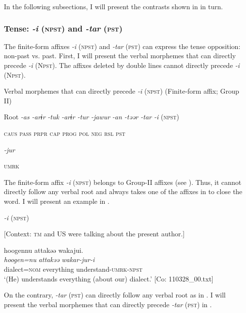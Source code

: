 In the following subsections, I will present the contrasts shown in  in turn.

\subsubsection{Tense: \textit{-i} (\textsc{npst}) and \textit{-tar} (\textsc{pst})}

The finite-form affixes \textit{-i} (\textsc{npst}) and \textit{-tar} (\textsc{pst}) can express the tense opposition: non-past vs. past. First, I will present the verbal morphemes that can directly precede \textit{-i} (N\textsc{pst}). The affixes deleted by double lines cannot directly precede \textit{-i} (N\textsc{pst}).

\ea\label{ex:8-53}
  Verbal morphemes that can directly precede \textit{-i} (\textsc{npst}) (Finite-form affix; Group II)

  Root  \textit{-as  -arɨr} %
\textit{-tuk  -arɨr  -tur  -jawur} %
\textit{-an  -təər  -tar  -i} (\textsc{npst})

    \textsc{caus}  \textsc{pass}  \textsc{prpr}  \textsc{cap}  \textsc{prog}  \textsc{pol}  \textsc{neg}  \textsc{rsl}  \textsc{pst}

          \textit{-jur}

          \textsc{umrk}
\z

The finite-form affix \textit{-i} (\textsc{npst}) belongs to Group-II affixes (see ). Thus, it cannot directly follow any verbal root and always takes one of the affixes in  to close the word. I will present an example in .

\ea\label{ex:8-54}
  \textit{-i} (\textsc{npst})

  [Context: \textsc{tm} and US were talking about the present author.]

  {\TM}
\glll  {\textbar}hoogen{\textbar}nu  attakəə  wakajui.\\
\textit{hoogen=nu}  \textit{attakəə}  \textit{wakar-jur-i}\\
    dialect=\textsc{nom}  everything  understand-\textsc{umrk}-\textsc{npst}\\
\glt ‘(He) understands everything (about our) dialect.’ [Co: 110328\_00.txt]
\z

  On the contrary, \textit{-tar} (\textsc{pst}) can directly follow any verbal root as in . I will present the verbal morphemes that can directly precede \textit{-tar} (\textsc{pst}) in .

